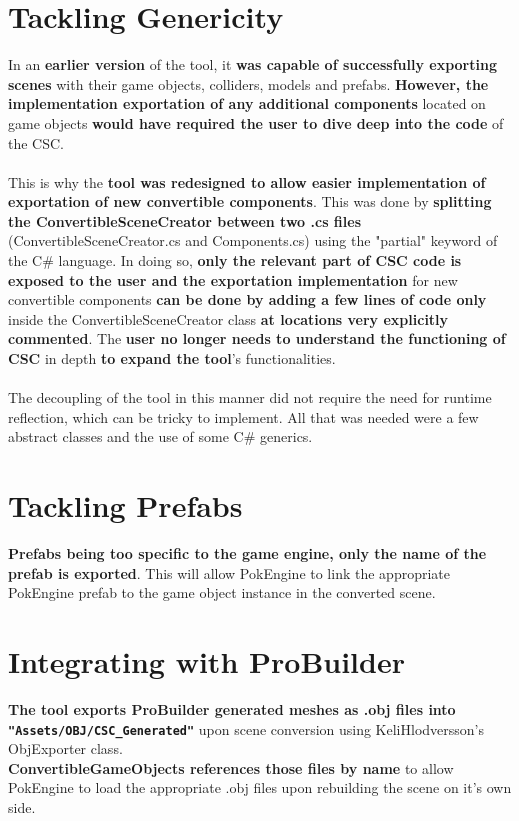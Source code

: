 \documentclass[12pt,a4paper]{article}
\begin{document}
\section{Tackling Genericity}
In an \textbf{earlier version} of the tool, it \textbf{was capable of successfully exporting scenes} with their game objects, colliders, models and prefabs. \textbf{However, the implementation exportation of any additional components} located on game objects \textbf{would have required the user to dive deep into the code} of the CSC.\\\\
This is why the \textbf{tool was redesigned to allow easier implementation of exportation of new convertible components}. This was done by \textbf{splitting the ConvertibleSceneCreator between two .cs files} (ConvertibleSceneCreator.cs and Components.cs) using the "partial" keyword of the C\# language.
\newpage
\noindent In doing so, \textbf{only the relevant part of CSC code is exposed to the user and the exportation implementation} for new convertible components \textbf{can be done by adding a few lines of code only} inside the ConvertibleSceneCreator class \textbf{at locations very explicitly commented}. The \textbf{user no longer needs to understand the functioning of CSC} in depth \textbf{to expand the tool}'s functionalities.\\\\
The decoupling of the tool in this manner did not require the need for runtime reflection, which can be tricky to implement. All that was needed were a few abstract classes and the use of some C\# generics.

\section{Tackling Prefabs}
\textbf{Prefabs being too specific to the game engine, only the name of the prefab is exported}. This will allow PokEngine to link the appropriate PokEngine prefab to the game object instance in the converted scene.

\section{Integrating with ProBuilder}
\textbf{The tool exports ProBuilder generated meshes as .obj files into \texttt{"Assets/OBJ/CSC\_Generated"}} upon scene conversion using KeliHlodversson's ObjExporter class.\\
\textbf{ConvertibleGameObjects references those files by name} to allow PokEngine to load the appropriate .obj files upon rebuilding the scene on it's own side.
\end{document}

